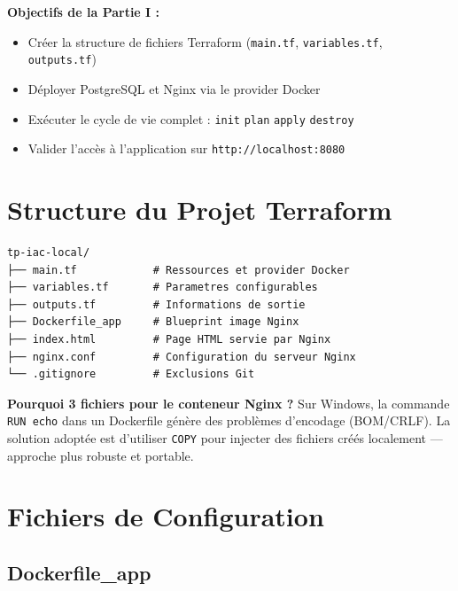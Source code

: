 \documentclass[12pt,a4paper]{article}
\begin{document}
\begin{tfbox}
\textbf{Objectifs de la Partie I :}
\begin{itemize}[leftmargin=1.5em]
  \item Créer la structure de fichiers Terraform (\texttt{main.tf}, \texttt{variables.tf}, \texttt{outputs.tf})
  \item Déployer PostgreSQL et Nginx via le provider Docker
  \item Exécuter le cycle de vie complet : \texttt{init} \textrightarrow{} \texttt{plan} \textrightarrow{} \texttt{apply} \textrightarrow{} \texttt{destroy}
  \item Valider l'accès à l'application sur \texttt{http://localhost:8080}
\end{itemize}
\end{tfbox}

\section{\textcolor{terraformPurple}{Structure du Projet Terraform}}

\begin{lstlisting}[style=termStyle, caption=Structure du répertoire tp-iac-local/]
tp-iac-local/
├── main.tf            # Ressources et provider Docker
├── variables.tf       # Parametres configurables
├── outputs.tf         # Informations de sortie
├── Dockerfile_app     # Blueprint image Nginx
├── index.html         # Page HTML servie par Nginx
├── nginx.conf         # Configuration du serveur Nginx
└── .gitignore         # Exclusions Git
\end{lstlisting}

\begin{warnbox}
\textbf{Pourquoi 3 fichiers pour le conteneur Nginx ?}
Sur Windows, la commande \texttt{RUN echo} dans un Dockerfile génère des problèmes
d'encodage (BOM/CRLF). La solution adoptée est d'utiliser \texttt{COPY} pour
injecter des fichiers créés localement --- approche plus robuste et portable.
\end{warnbox}

\section{\textcolor{terraformPurple}{Fichiers de Configuration}}

\subsection{Dockerfile\_app}
\end{document}
